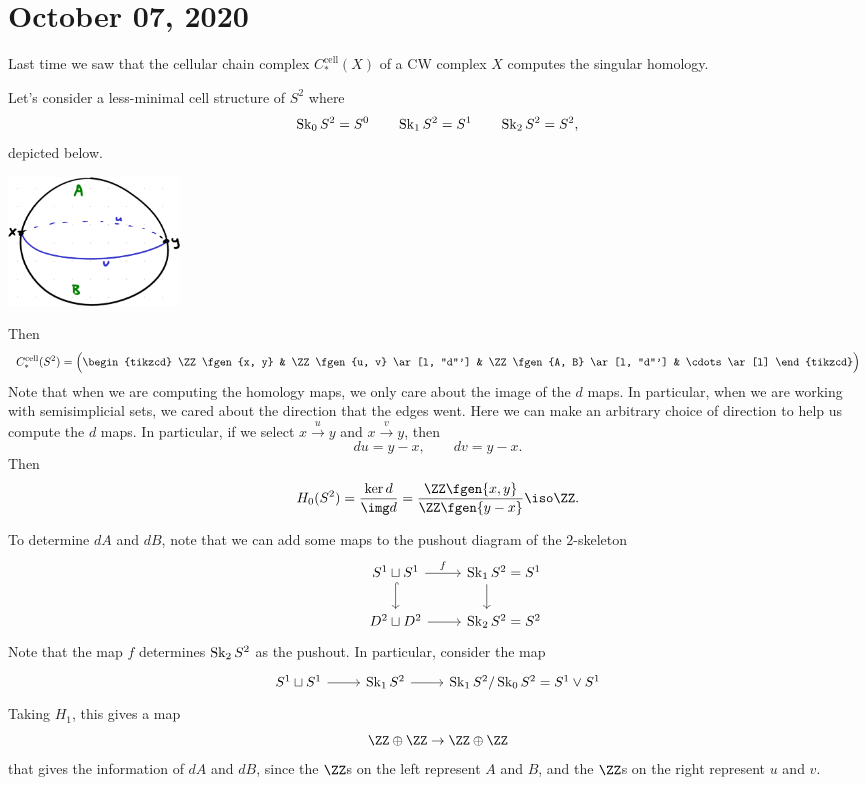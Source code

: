 \documentclass{standalone}
\begin{document}
\chapter{October 07, 2020}

Last time we saw that the cellular chain complex \(C_*^{\text{cell}}(X)\) of
a CW complex \(X\) computes the singular homology.

\begin{example}[\(S^2\)]
  Let's consider a less-minimal cell structure of \(S^2\) where
  \[
    \operatorname{Sk}_0 S^2 = S^0 \qquad
    \operatorname{Sk}_1 S^2 = S^1 \qquad
    \operatorname{Sk}_2 S^2 = S^2,
  \]
  depicted below.
  \begin{center}
    \includegraphics[width=0.2\textwidth]{18_905-201007-1.png}
  \end{center}
  Then
  \[
    C_*^{\text{cell}}(S^2) = \Big({
      \begin{tikzcd}
        \ZZ\fgen{x, y} &
        \ZZ\fgen{u, v} \ar[l, "d"'] &
        \ZZ\fgen{A, B} \ar[l, "d"'] &
        \cdots \ar[l]
      \end{tikzcd}
    }\Big)
  \]
  Note that when we are computing the homology maps,
  we only care about the image of the \(d\) maps.
  In particular, when we are working with semisimplicial sets,
  we cared about the direction that the edges went.
  Here we can make an arbitrary choice of direction to help us
  compute the \(d\) maps.
  In particular, if we select \(x \overset{u}\to y\)
  and \(x \overset{v}\to y\), then
  \[
    du = y - x, \qquad dv = y - x.
  \]
  Then
  \[
    H_0(S^2) = \frac{\ker d}{\img d} = \frac{\ZZ\fgen{x, y}}{\ZZ\fgen{y - x}}
      \iso \ZZ.
  \]

  To determine \(dA\) and \(dB\), note that we can add some maps
  to the pushout diagram of the \(2\)-skeleton
  \[
    \begin{tikzcd}
      S^1 \sqcup S^1 \arrow[r, "f"] \arrow[d, hook] &
        \Sk_1 S^2 \mathrlap{{} = S^1} \arrow[d] \\
      D^2 \sqcup D^2 \arrow[r] &
        \Sk_2 S^2 \mathrlap{{} = S^2}
    \end{tikzcd}
  \]
  Note that the map \(f\) determines \(\operatorname{Sk}_2 S^2\) as the pushout.
  In particular, consider the map
  \[
    \begin{tikzcd}
      S^1 \sqcup S^1 \ar[r] &
      \Sk_1 S^2 \ar[r] &
      \Sk_1 S^2 / \Sk_0 S^2 = S^1 \vee S^1
    \end{tikzcd}
  \]
  Taking \(H_1\), this gives a map
  \[
    \ZZ \oplus \ZZ \to \ZZ \oplus \ZZ
  \]
  that gives the information of \(dA\) and \(dB\),
  since the \(\ZZ\)s on the left represent \(A\) and \(B\),
  and the \(\ZZ\)s on the right represent \(u\) and \(v\).


\end{example}
\end{document}
